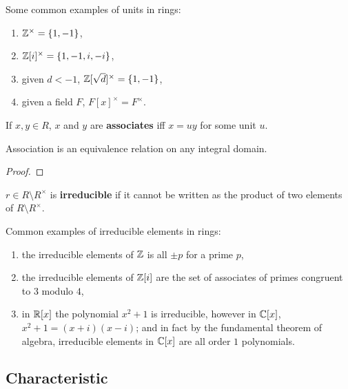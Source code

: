 \documentclass{report}
\begin{document}
\begin{examples}
    Some common examples of units in rings: \begin{enumerate}
        \item $\mathbb{Z}^\times = \{1,-1\}$,
        \item $\mathbb{Z}[i]^\times=\{1,-1,i,-i\}$,
        \item given $d<-1$, $\mathbb{Z}[\sqrt{d}]^\times=\{1,-1\}$,
        \item given a field $F$, $F[x]^\times=F^\times$.
    \end{enumerate}
\end{examples}

\begin{definition}[Associates]
    If $x,y\in R$, $x$ and $y$ are \textbf{associates} iff $x=uy$ for some unit $u$.
\end{definition}

\begin{proposition}
    Association is an equivalence relation on any integral domain.
    \begin{proof}
        
    \end{proof}
\end{proposition}

\begin{definition}[Irreducible]
    $r\in R\setminus R^\times$ is \textbf{irreducible} if it cannot be written as the product of two elements of $R\setminus R^\times$.
\end{definition}

\begin{examples}
    Common examples of irreducible elements in rings: \begin{enumerate}
        \item the irreducible elements of $\mathbb{Z}$ is all $\pm p$ for a prime $p$,
        \item the irreducible elements of $\mathbb{Z}[i]$ are the set of associates of primes congruent to $3$ modulo $4$,
        \item in $\mathbb{R}[x]$ the polynomial $x^2+1$ is irreducible, however in $\mathbb{C}[x]$, $x^2+1=(x+i)(x-i)$; and in fact by the fundamental theorem of algebra, irreducible elements in $\mathbb{C}[x]$ are all order $1$ polynomials.
    \end{enumerate}
\end{examples}

\subsection{Characteristic}
\end{document}
